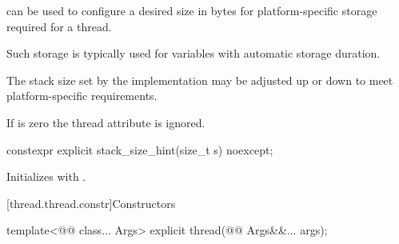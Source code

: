 \documentclass{wg21}
\begin{document}
\begin{addedblock}
 can be used to configure a desired size in bytes for platform-specific storage required for a thread. \begin{note}
Such storage is typically used for variables with automatic storage duration.	
\end{note}

The stack size set by the implementation may be adjusted up or down to meet platform-specific requirements.

If  is zero the thread attribute is ignored.

\begin{itemdecl}
constexpr explicit stack_size_hint(size_t s) noexcept;
\end{itemdecl}

\begin{itemdescr}
\effects Initializes  with .
\end{itemdescr}

\end{addedblock}


[thread.thread.constr]{Constructors}

\begin{itemdecl}
template<@@ class... Args>
explicit thread(@@ Args&&... args);
\end{itemdecl}
\end{document}
